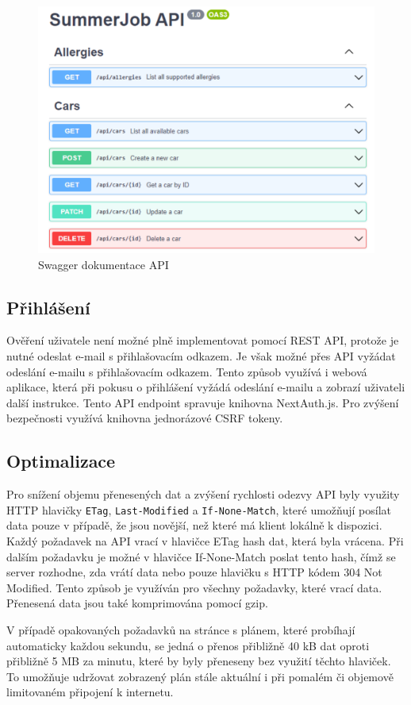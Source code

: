 \begin{figure}[h]
    \centering
    \includegraphics[width=1\textwidth]{chapters/images/swagger.pdf}
    \caption{Swagger dokumentace API}
    \label{fig:swagger}
\end{figure}

\subsection{Přihlášení}

Ověření uživatele není možné plně implementovat pomocí REST API, protože je nutné odeslat e-mail s přihlašovacím odkazem.
Je však možné přes API vyžádat odeslání e-mailu s přihlašovacím odkazem. Tento způsob využívá i webová aplikace, která při pokusu o přihlášení
vyžádá odeslání e-mailu a zobrazí uživateli další instrukce. Tento API endpoint spravuje knihovna NextAuth.js. Pro zvýšení bezpečnosti využívá knihovna
jednorázové CSRF tokeny. 

\subsection{Optimalizace}

Pro snížení objemu přenesených dat a zvýšení rychlosti odezvy API byly využity HTTP hlavičky \texttt{ETag}, \texttt{Last-Modified} a \texttt{If-None-Match}, které umožňují
posílat data pouze v případě, že jsou novější, než které má klient lokálně k dispozici.
Každý požadavek na API vrací v hlavičce ETag hash dat, která byla vrácena. Při dalším požadavku je možné v hlavičce If-None-Match poslat tento hash,
čímž se server rozhodne, zda vrátí data nebo pouze hlavičku s HTTP kódem 304 Not Modified. Tento způsob je využíván pro všechny požadavky, které vrací data.
Přenesená data jsou také komprimována pomocí gzip.

V případě opakovaných požadavků na stránce s plánem, které probíhají automaticky každou sekundu, se jedná o přenos přibližně 40 kB dat oproti
přibližně 5 MB za minutu, které by byly přeneseny bez využití těchto hlaviček. To umožňuje udržovat zobrazený plán stále aktuální i při pomalém či objemově limitovaném
připojení k internetu.

